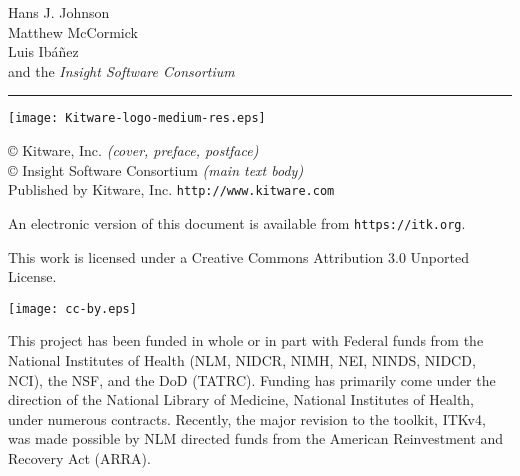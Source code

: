 \hfill

\ifitkPrintedVersionFirstPage
\begin{minipage}[t][6cm][b]{0.6\textwidth}
\Large
\renewcommand{\baselinestretch}{1.5}
Hans J. Johnson\\
Matthew McCormick \\
Luis Ib\'{a}\~{n}ez\\
and the \emph{Insight Software Consortium}
\normalsize
\end{minipage}


\begin{minipage}[t][2cm][b]{\textwidth}
\rule{14cm}{1pt}
\end{minipage}

\newpage
\fi

\begin{minipage}[t][4cm][b]{\textwidth}
\begin{center}
\texttt{[image: Kitware-logo-medium-res.eps]}
\end{center}
\par
\begin{center}
\large

\copyright \the\year \; Kitware, Inc. \emph{(cover, preface, postface)}\\
\copyright \the\year \; Insight Software Consortium \emph{(main text body)}\\
Published by Kitware, Inc. \texttt{http://www.kitware.com}
\normalsize
\end{center}
\end{minipage}


\begin{minipage}[t][2.5cm][b]{\textwidth}
\begin{center}
An electronic version of this document is available from
\texttt{https://itk.org}.
\end{center}
\begin{center}
This work is licensed under a Creative Commons Attribution 3.0 Unported License.
\end{center}
\begin{center}
\texttt{[image: cc-by.eps]}
\end{center}
\end{minipage}


\begin{minipage}[t][2.5cm][b]{\textwidth}
\begin{center}
This project has been funded in whole or in part with Federal funds from the
National Institutes of Health (NLM, NIDCR, NIMH, NEI, NINDS, NIDCD, NCI), the
NSF, and the DoD (TATRC). Funding has primarily come under the direction of the
National Library of Medicine, National Institutes of Health, under numerous
contracts. Recently, the major revision to the toolkit, ITKv4, was made
possible by NLM directed funds from the American Reinvestment and Recovery Act
(ARRA).
\end{center}
\end{minipage}


